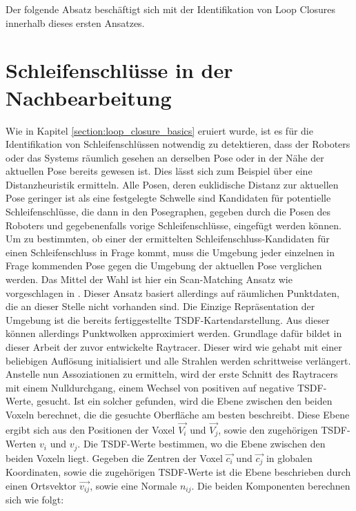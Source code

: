 Der folgende Absatz beschäftigt sich mit der Identifikation von Loop Closures innerhalb dieses ersten Ansatzes.


\section{Schleifenschlüsse in der Nachbearbeitung}
\label{section:ass_lc}

Wie in Kapitel \ref{section:loop_closure_basics} eruiert wurde, ist es für die Identifikation von Schleifenschlüssen notwendig zu detektieren, dass der Roboters oder das Systems räumlich gesehen an derselben Pose oder in der Nähe der aktuellen Pose bereits gewesen ist. Dies lässt sich zum Beispiel über eine Distanzheuristik ermitteln. Alle Posen, deren euklidische Distanz zur aktuellen Pose geringer ist als eine festgelegte Schwelle sind Kandidaten für potentielle Schleifenschlüsse, die dann in den Posegraphen, gegeben durch die Posen des Roboters und gegebenenfalls vorige Schleifenschlüsse, eingefügt werden können. Um zu bestimmten, ob einer der ermittelten Schleifenschluss-Kandidaten für einen Schleifenschluss in Frage kommt, muss die Umgebung jeder einzelnen in Frage kommenden Pose gegen die Umgebung der aktuellen Pose verglichen werden. Das Mittel der Wahl ist hier ein Scan-Matching Ansatz wie vorgeschlagen in \cite{lu1997globally,shan2020lio,borrmann2008globally}. Dieser Ansatz basiert allerdings auf räumlichen Punktdaten, die an dieser Stelle nicht vorhanden sind. Die Einzige Repräsentation der Umgebung ist die bereits fertiggestellte TSDF-Kartendarstellung. Aus dieser können allerdings Punktwolken approximiert werden. Grundlage dafür bildet in dieser Arbeit der zuvor entwickelte Raytracer. Dieser wird wie gehabt mit einer beliebigen Auflösung initialisiert und alle Strahlen werden schrittweise verlängert. Anstelle nun Assoziationen zu ermitteln, wird der erste Schnitt des Raytracers mit einem Nulldurchgang, einem Wechsel von positiven auf negative TSDF-Werte, gesucht. Ist ein solcher gefunden, wird die Ebene zwischen den beiden Voxeln berechnet, die die gesuchte Oberfläche am besten beschreibt. Diese Ebene ergibt sich aus den Positionen der Voxel $\vec{V_i}$ und $\vec{V_j}$, sowie den zugehörigen TSDF-Werten $v_i$ und $v_j$. Die TSDF-Werte bestimmen, wo die Ebene zwischen den beiden Voxeln liegt. Gegeben die Zentren der Voxel $\vec{c_i}$ und $\vec{c_j}$ in globalen Koordinaten, sowie die zugehörigen TSDF-Werte ist die Ebene beschrieben durch einen Ortsvektor $\vec{v_{ij}}$, sowie eine Normale $n_{ij}$. Die beiden Komponenten berechnen sich wie folgt:


